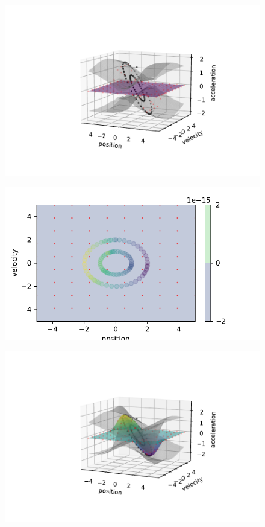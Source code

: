 \documentclass{article}
\begin{document}
\begin{figure}[H]
  \includegraphics[width=1.2\linewidth]{prior_invariance_3D.pdf}
  \centering
\end{figure}
\begin{figure}[H]
  \includegraphics[width=\linewidth]{prior_invariance_contour.pdf}
  \centering
\end{figure}
\begin{figure}[H]
  \includegraphics[width=1.2\linewidth]{posterior_invariance_3D.pdf}
  \centering
\end{figure}
\end{document}
